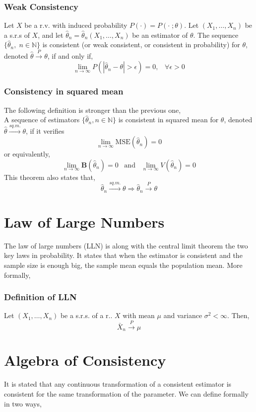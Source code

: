 \subsubsection{Weak Consistency}
Let $X$ be a r.v. with induced probability $P( \cdot ) = P(\cdot\;;\theta)$. Let
$(X_1,\dots,X_n)$ be a s.r.s of $X$, and let $\hat{\theta}_n =
\hat{\theta}_n(X_1,\dots,X_n)$ be an estimator of $\theta$. The sequence
$\{\hat{\theta}_n,\; n \in \mathbb{N}\}$ is consistent (or weak consistent, or
consistent in probability) for $\theta$, denoted
$\hat{\theta}\xrightarrow{P}\theta$, if and only if,
\[ \lim_{n\rightarrow\infty} P(|\hat{\theta}_n - \theta| > \epsilon)=0,\;\;\;
\forall \epsilon>0\]

\subsubsection{Consistency in squared mean}
The following definition is stronger than the previous one,\\
A sequence of estimators $\{\hat{\theta}_n, n \in \mathbb{N}\}$ is consistent in
squared mean for $\theta$, denoted $\hat{\theta}\xrightarrow{sq.m.}\theta$, if
it verifies
\[ \lim_{n\rightarrow\infty} \text{MSE}(\hat{\theta}_n) = 0 \] or equivalently,
\[ \lim_{n\rightarrow\infty} \textbf{B}(\hat{\theta}_n) = 0 \;\;\;
\text{and}\;\;\; \lim_{n\rightarrow\infty} V(\hat{\theta}_n) = 0 \] This theorem
also states that,
\[ \hat{\theta}_n \xrightarrow{sq.m.}\theta \Rightarrow \hat{\theta}_n
\xrightarrow{P}\theta \]

\section{Law of Large Numbers}
The law of large numbers (LLN) is along with the central limit theorem the two
key laws in probability. It states that when the estimator is consistent and the
sample size is enough big, the sample mean equals the population mean. More
formally,
\subsubsection{Definition of LLN}
Let $(X_1,\dots,X_n)$ be a s.r.s. of a r.. $X$ with mean $\mu$ and variance
$\sigma^2<\infty$. Then,
\[ \bar{X}_n \xrightarrow{P} \mu \]

\section{Algebra of Consistency}
It is stated that any continuous transformation of a consistent estimator is
consistent for the same transformation of the parameter. We can define formally
in two ways,\\

